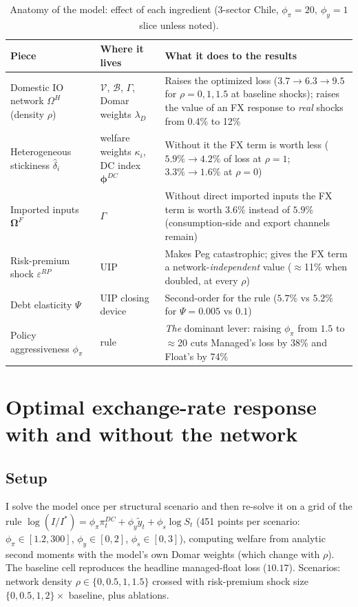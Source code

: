 \documentclass[11pt]{article}
\begin{document}
\begin{table}[H]
\centering\small
\begin{tabular}{p{3.0cm}p{4.3cm}p{6.6cm}}
\toprule
Piece & Where it lives & What it does to the results \\
\midrule
Domestic IO network $\Omega^H$ (density $\rho$) & $\mathcal V$, $\mathcal B$, $\Gamma$, Domar weights $\lambda_D$ & Raises the optimized loss ($3.7\to6.3\to9.5$ for $\rho=0,1,1.5$ at baseline shocks); raises the value of an FX response to \emph{real} shocks from 0.4\% to 12\% \\[2pt]
Heterogeneous stickiness $\hat\delta_i$ & welfare weights $\kappa_i$, DC index $\bm\phi^{DC}$ & Without it the FX term is worth less ($5.9\%\to4.2\%$ of loss at $\rho=1$; $3.3\%\to1.6\%$ at $\rho=0$) \\[2pt]
Imported inputs $\bm\Omega^F$ & $\Gamma$ & Without direct imported inputs the FX term is worth $3.6\%$ instead of $5.9\%$ (consumption-side and export channels remain) \\[2pt]
Risk-premium shock $\varepsilon^{RP}$ & UIP & Makes Peg catastrophic; gives the FX term a network-\emph{independent} value ($\approx$11\% when doubled, at every $\rho$) \\[2pt]
Debt elasticity $\Psi$ & UIP closing device & Second-order for the rule ($5.7\%$ vs $5.2\%$ for $\Psi=0.005$ vs $0.1$) \\[2pt]
Policy aggressiveness $\phi_\pi$ & rule & \emph{The} dominant lever: raising $\phi_\pi$ from $1.5$ to $\approx$20 cuts Managed's loss by 38\% and Float's by 74\% \\
\bottomrule
\end{tabular}
\caption{Anatomy of the model: effect of each ingredient (3-sector Chile, $\phi_\pi=20,\ \phi_y=1$ slice unless noted).}
\end{table}

\section{Optimal exchange-rate response with and without the network}

\subsection{Setup}

I solve the model once per structural scenario and then re-solve it on a grid of the rule
$\log(I/I^*)=\phi_\pi\pi^{DC}_t+\phi_y\tilde y_t+\phi_s\log S_t$ (451 points per scenario: $\phi_\pi\in[1.2,300]$,
$\phi_y\in[0,2]$, $\phi_s\in[0,3]$), computing welfare from analytic second moments with the model's own Domar weights
(which change with $\rho$). The baseline cell reproduces the headline managed-float loss ($10.17$). Scenarios: network
density $\rho\in\{0,0.5,1,1.5\}$ crossed with risk-premium shock size $\{0,0.5,1,2\}\times$ baseline, plus ablations.
\end{document}
